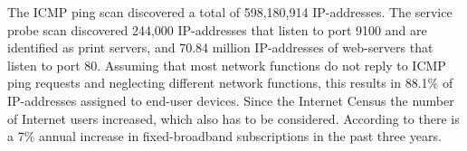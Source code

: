 The ICMP ping scan discovered a total of 598,180,914 IP-addresses.
The service probe scan discovered 244,000 IP-addresses that listen to port 9100 and are identified as print servers, and 70.84 million IP-addresses of web-servers that listen to port 80.
Assuming that most network functions do not reply to ICMP ping requests and neglecting different network functions, this results in 88.1\% of IP-addresses assigned to end-user devices.
Since the Internet Census the number of Internet users increased, which also has to be considered.
According to \cite{itu2015facts} there is a 7\% annual increase in fixed-broadband subscriptions in the past three years.

%


